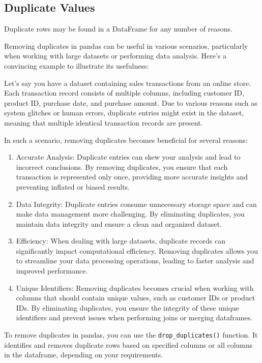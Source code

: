 \documentclass[
  letterpaper,
  DIV=11,
  numbers=noendperiod]{scrreprt}
\begin{document}
\hypertarget{duplicate-values}{%
\subsection{Duplicate Values}\label{duplicate-values}}

Duplicate rows may be found in a DataFrame for any number of reasons.

Removing duplicates in pandas can be useful in various scenarios,
particularly when working with large datasets or performing data
analysis. Here's a convincing example to illustrate its usefulness:

Let's say you have a dataset containing sales transactions from an
online store. Each transaction record consists of multiple columns,
including customer ID, product ID, purchase date, and purchase amount.
Due to various reasons such as system glitches or human errors,
duplicate entries might exist in the dataset, meaning that multiple
identical transaction records are present.

In such a scenario, removing duplicates becomes beneficial for several
reasons:

\begin{enumerate}
\def\labelenumi{\arabic{enumi}.}
\item
  Accurate Analysis: Duplicate entries can skew your analysis and lead
  to incorrect conclusions. By removing duplicates, you ensure that each
  transaction is represented only once, providing more accurate insights
  and preventing inflated or biased results.
\item
  Data Integrity: Duplicate entries consume unnecessary storage space
  and can make data management more challenging. By eliminating
  duplicates, you maintain data integrity and ensure a clean and
  organized dataset.
\item
  Efficiency: When dealing with large datasets, duplicate records can
  significantly impact computational efficiency. Removing duplicates
  allows you to streamline your data processing operations, leading to
  faster analysis and improved performance.
\item
  Unique Identifiers: Removing duplicates becomes crucial when working
  with columns that should contain unique values, such as customer IDs
  or product IDs. By eliminating duplicates, you ensure the integrity of
  these unique identifiers and prevent issues when performing joins or
  merging dataframes.
\end{enumerate}

To remove duplicates in pandas, you can use the
\texttt{drop\_duplicates()} function. It identifies and removes
duplicate rows based on specified columns or all columns in the
dataframe, depending on your requirements.
\end{document}
